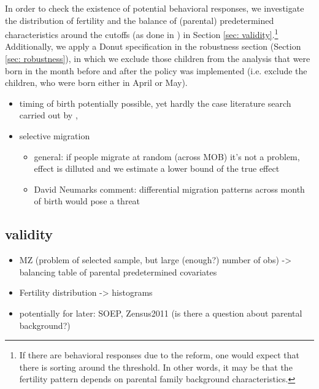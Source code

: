 \documentclass[11pt, a4paper,draft]{article} %
\begin{document}
In order to check the existence of potential behavioral responses, we investigate the distribution of fertility and the balance of (parental) predetermined characteristics around the cutoffs (as done in \cite{dinardo2004economic}) in Section \ref{sec: validity}.\footnote{If there are behavioral responses due to the reform, one would expect that there is sorting around the threshold. In other words, it may be that the fertility pattern depends on parental family background characteristics.} Additionally, we apply a Donut specification in the robustness section (Section \ref{sec: robustness}), in which we exclude those children from the analysis that were born in the month before and after the policy was implemented (i.e. exclude the children, who were born either in April or May).



\begin{itemize}
	\item timing of birth potentially possible, yet hardly the case literature search carried out by \cite{Dustmann2012},
	\item selective migration 
  \begin{itemize}
    \item general: if people migrate at random (across MOB) it's not a problem, effect is dilluted and we estimate a lower bound of the true effect
    \item David Neumarks comment: differential migration patterns across month of birth would pose a threat
  \end{itemize}
\end{itemize}




\subsection{validity}\label{sec:empirical_strategy_3validity}
\begin{itemize}
	\item MZ (problem of selected sample, but large (enough?) number of obs) -> balancing table of parental predetermined covariates
	\item Fertility distribution  -> histograms
	\item potentially for later: SOEP, Zensus2011 (is there a question about parental background?)
\end{itemize}

\end{document}
